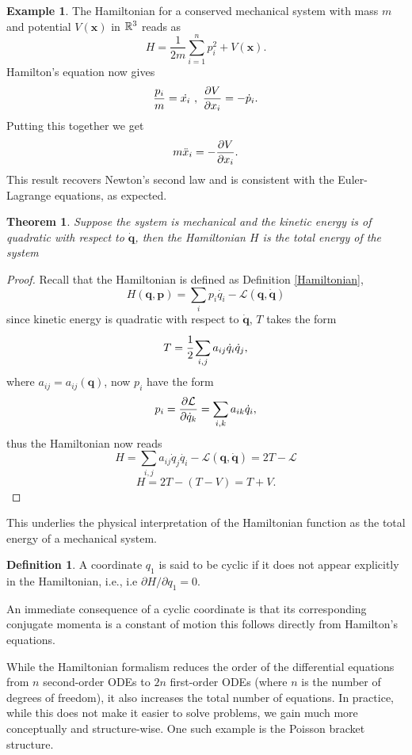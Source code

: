 \documentclass[12pt,oneside]{report}
\newtheorem{theorem}{Theorem}[section]  %
\theoremstyle{definition}
\newtheorem{definition}{Definition}
\newtheorem{example}{Example}
\renewcommand{\d}{\partial}
\begin{document}
\begin{example}
    The Hamiltonian for a conserved mechanical system with mass $m$ and potential $V(\textbf{x})$ in $\mathbb{R}^{3}$ reads as
    \begin{equation}
        H = \frac{1}{2m}\sum_{i=1}^{n} p_{i}^{2}+V(\textbf{x}).
    \end{equation}
    Hamilton's equation now gives
    $$ \frac{p_{i}}{m} = \dot{x_{i}}  \ , \ \pd{V}{x_{i}} = -\dot{p}_{i}.$$
    Putting this together we get
    $$ m\ddot{x}_{i} = -\displaystyle\frac{\partial V}{\partial x_{i}}.$$
    This result recovers Newton's second law and is consistent with the Euler-Lagrange equations, as expected.
\end{example}

\begin{theorem}
  Suppose the system is mechanical and the kinetic energy is of quadratic with respect to $\dot{\textbf{q}}$, then the Hamiltonian $H$ is the total energy of the system  
\end{theorem}
\begin{proof}
 Recall that the Hamiltonian is defined as Definition \ref{Hamiltonian},
$$  H(\textbf{q},\textbf{p}) = \sum_{i} p_{i} \dot{q_{i}} - \mathcal{L}(\textbf{q}, \dot{\textbf{q}})$$
since kinetic energy is quadratic with respect to  $\dot{\textbf{q}}$, $T$ takes the form
$$  T = \cfrac{1}{2} \sum_{i,j}a_{ij}\dot{q}_{i}\dot{q}_{j},$$
where $a_{ij} = a_{ij}(\textbf{q})$, now $p_{i}$ have the form\
$$ p_{i} = \displaystyle\frac{\partial \mathcal{L}}{\partial \dot{q}_{k}} =  \sum_{i,k}a_{ik}\dot{q}_{i} ,$$
thus the Hamiltonian now reads
$$ H =  \sum_{i,j}a_{ij}\dot{q}_{j}\dot{q_{i}} - \mathcal{L}(\textbf{q}, \dot{\textbf{q}}) = 2T - \mathcal{L}$$
$$  H = 2T-(T-V) = T+V .$$

\end{proof}
\noindent This underlies the physical interpretation of the Hamiltonian function as the total energy of a mechanical system.
\begin{definition}
   A coordinate $q_{1}$ is said to be cyclic if it does not appear explicitly in the Hamiltonian, i.e., i.e $\d H/\d q_{1} =0$. 
\end{definition}
\noindent An immediate consequence of a cyclic coordinate is that its corresponding conjugate momenta is a constant of motion this follows directly from Hamilton's equations.

While the Hamiltonian formalism reduces the order of the differential equations from $n$ second-order ODEs to $2n$ first-order ODEs (where
$n$ is the number of degrees of freedom), it also increases the total number of equations. In practice, while this does not make it easier to solve problems, we gain much more conceptually and structure-wise. One such example is the Poisson bracket structure.
\end{document}
